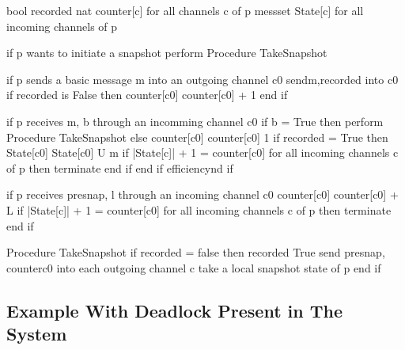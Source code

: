 \documentclass[letterpaper,10pt,english]{sphinxmanual}
\begin{document}
\begin{sphinxVerbatim}[commandchars=\\\{\},numbers=left,firstnumber=1,stepnumber=1]
bool recorded
nat counter[c] for all channels c of p
mess\PYGZhy{}set State[c] for all incoming channels of p

if p wants to initiate a snapshot
perform Procedure TakeSnapshot

if p sends a basic message m into an outgoing channel c\PYGZlt{}0\PYGZgt{}
send\PYGZlt{}m,recorded\PYGZgt{} into c\PYGZlt{}0\PYGZgt{}
if recorded is False then
    counter[c\PYGZlt{}0\PYGZgt{}] \PYGZlt{}\PYGZhy{} counter[c\PYGZlt{}0\PYGZgt{}] + 1
end if

if p receives \PYGZlt{}m, b\PYGZgt{} through an incomming channel c\PYGZlt{}0\PYGZgt{}
if b = True then
    perform Procedure TakeSnapshot
else
    counter[c\PYGZlt{}0\PYGZgt{}] \PYGZlt{}\PYGZhy{} counter[c\PYGZlt{}0\PYGZgt{}] \PYGZhy{} 1
    if recorded = True then
        State[c\PYGZlt{}0\PYGZgt{}] \PYGZlt{}\PYGZhy{} State[c\PYGZlt{}0\PYGZgt{}] U \PYGZob{}m\PYGZcb{}
        if |State[c]| + 1 = counter[c\PYGZlt{}0\PYGZgt{}] for all incoming channels c of p then
            terminate
        end if
    end if
efficiencynd if


if p receives \PYGZlt{}presnap, l\PYGZgt{} through an incoming channel c\PYGZlt{}0\PYGZgt{}
counter[c\PYGZlt{}0\PYGZgt{}] \PYGZlt{}\PYGZhy{} counter[c\PYGZlt{}0\PYGZgt{}] + L
if |State[c]| + 1 = counter[c\PYGZlt{}0\PYGZgt{}] for all incoming channels c of p then
    terminate
end if

Procedure TakeSnapshot
if recorded = false then
    recorded \PYGZlt{}\PYGZhy{} True
    send \PYGZlt{}presnap, counter\PYGZlt{}c0\PYGZgt{}\PYGZgt{} into each outgoing channel c
    take a local snapshot state of p
end if
\end{sphinxVerbatim}


\subsection{Example With Deadlock Present in The System}
\label{\detokenize{docs/BrachaToueg/algorithm:example-with-deadlock-present-in-the-system}}
\end{document}
